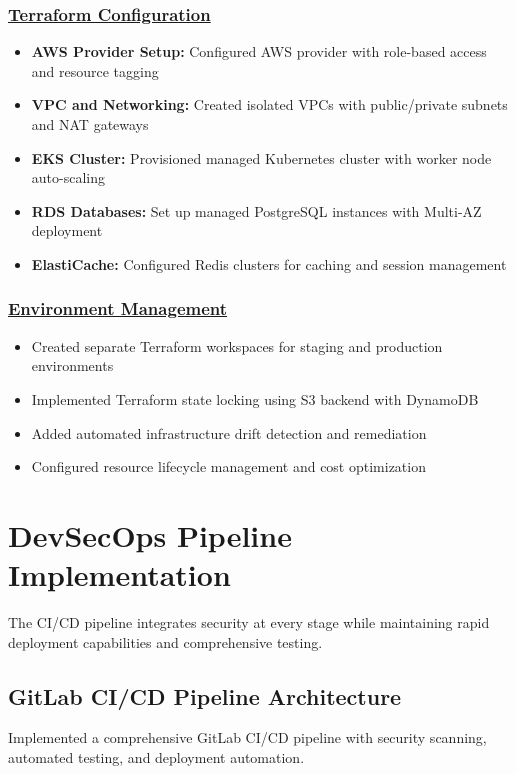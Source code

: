 \subsubsection*{\underline{Terraform Configuration}}
\begin{itemize}
    \item \textbf{AWS Provider Setup:} Configured AWS provider with role-based access and resource tagging
    \item \textbf{VPC and Networking:} Created isolated VPCs with public/private subnets and NAT gateways
    \item \textbf{EKS Cluster:} Provisioned managed Kubernetes cluster with worker node auto-scaling
    \item \textbf{RDS Databases:} Set up managed PostgreSQL instances with Multi-AZ deployment
    \item \textbf{ElastiCache:} Configured Redis clusters for caching and session management
\end{itemize}

\subsubsection*{\underline{Environment Management}}
\begin{itemize}
    \item Created separate Terraform workspaces for staging and production environments
    \item Implemented Terraform state locking using S3 backend with DynamoDB
    \item Added automated infrastructure drift detection and remediation
    \item Configured resource lifecycle management and cost optimization
\end{itemize}

\section{DevSecOps Pipeline Implementation}
The CI/CD pipeline integrates security at every stage while maintaining rapid deployment capabilities and comprehensive testing.

\subsection{GitLab CI/CD Pipeline Architecture}
Implemented a comprehensive GitLab CI/CD pipeline with security scanning, automated testing, and deployment automation.

